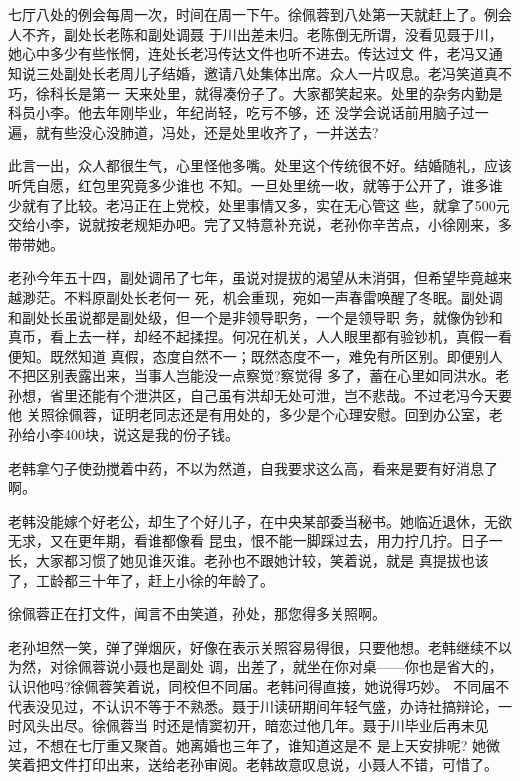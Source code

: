 \documentclass[11pt,a4paper,onecolumn]{article}
\begin{document}
\setcounter{section}{0}
\pagestyle{fancy}


\begin{center}
\end{center}

\section[\thesection]{} 
七厅八处的例会每周一次，时间在周一下午。徐佩蓉到八处第一天就赶上了。例会人不齐，副处长老陈和副处调聂
于川出差未归。老陈倒无所谓，没看见聂于川，她心中多少有些怅惘，连处长老冯传达文件也听不进去。传达过文
件，老冯又通知说三处副处长老周儿子结婚，邀请八处集体出席。众人一片叹息。老冯笑道真不巧，徐科长是第一
天来处里，就得凑份子了。大家都笑起来。处里的杂务内勤是科员小李。他去年刚毕业，年纪尚轻，吃亏不够，还
没学会说话前用脑子过一遍，就有些没心没肺道，冯处，还是处里收齐了，一并送去?

此言一出，众人都很生气，心里怪他多嘴。处里这个传统很不好。结婚随礼，应该听凭自愿，红包里究竟多少谁也
不知。一旦处里统一收，就等于公开了，谁多谁少就有了比较。老冯正在上党校，处里事情又多，实在无心管这
些，就拿了500元交给小李，说就按老规矩办吧。完了又特意补充说，老孙你辛苦点，小徐刚来，多带带她。

老孙今年五十四，副处调吊了七年，虽说对提拔的渴望从未消弭，但希望毕竟越来越渺茫。不料原副处长老何一
死，机会重现，宛如一声春雷唤醒了冬眠。副处调和副处长虽说都是副处级，但一个是非领导职务，一个是领导职
务，就像伪钞和真币，看上去一样，却经不起揉捏。何况在机关，人人眼里都有验钞机，真假一看便知。既然知道
真假，态度自然不一；既然态度不一，难免有所区别。即便别人不把区别表露出来，当事人岂能没一点察觉?察觉得
多了，蓄在心里如同洪水。老孙想，省里还能有个泄洪区，自己虽有洪却无处可泄，岂不悲哉。不过老冯今天要他
关照徐佩蓉，证明老同志还是有用处的，多少是个心理安慰。回到办公室，老孙给小李400块，说这是我的份子钱。

老韩拿勺子使劲搅着中药，不以为然道，自我要求这么高，看来是要有好消息了啊。

老韩没能嫁个好老公，却生了个好儿子，在中央某部委当秘书。她临近退休，无欲无求，又在更年期，看谁都像看
昆虫，恨不能一脚踩过去，用力拧几拧。日子一长，大家都习惯了她见谁灭谁。老孙也不跟她计较，笑着说，就是
真提拔也该了，工龄都三十年了，赶上小徐的年龄了。

徐佩蓉正在打文件，闻言不由笑道，孙处，那您得多关照啊。

老孙坦然一笑，弹了弹烟灰，好像在表示关照容易得很，只要他想。老韩继续不以为然，对徐佩蓉说小聂也是副处
调，出差了，就坐在你对桌——你也是省大的，认识他吗?徐佩蓉笑着说，同校但不同届。老韩问得直接，她说得巧妙。
不同届不代表没见过，不认识不等于不熟悉。聂于川读研期间年轻气盛，办诗社搞辩论，一时风头出尽。徐佩蓉当
时还是情窦初开，暗恋过他几年。聂于川毕业后再未见过，不想在七厅重又聚首。她离婚也三年了，谁知道这是不
是上天安排呢? 她微笑着把文件打印出来，送给老孙审阅。老韩故意叹息说，小聂人不错，可惜了。
\end{document}
